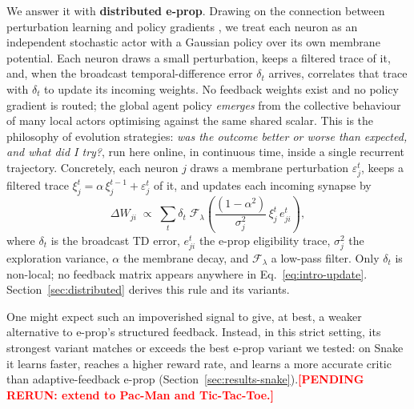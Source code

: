 \documentclass[10pt,twocolumn]{article}
\newcommand{\pending}[1]{\textcolor{red}{\bfseries[PENDING RERUN#1]}}
\begin{document}
We answer it with \textbf{distributed e-prop}. Drawing on the connection
between perturbation learning and policy gradients
\citep{fiete2006gradient,salimans2017evolutionstrategiesscalablealternative},
we treat each neuron as an independent stochastic actor with a Gaussian policy
over its own membrane potential. Each neuron draws a small perturbation, keeps
a filtered trace of it, and, when the broadcast temporal-difference error
$\delta_t$ arrives, correlates that trace with $\delta_t$ to update its
incoming weights. No feedback weights exist and no policy gradient is routed;
the global agent policy \emph{emerges} from the collective behaviour of many
local actors optimising against the same shared scalar. This is the
philosophy of evolution strategies: \emph{was the outcome better or worse
than expected, and what did I try?}, run here online, in continuous time,
inside a single recurrent trajectory. Concretely, each neuron $j$ draws a
membrane perturbation
$\varepsilon_j^t$, keeps a filtered trace
$\xi_j^t = \alpha\,\xi_j^{t-1} + \varepsilon_j^t$ of it, and updates each incoming
synapse by
\begin{equation}
\Delta W_{ji} \;\propto\; \sum_t \delta_t\;
\mathcal{F}_{\lambda}\!\left(
\frac{(1-\alpha^2)}{\sigma_j^2}\,\xi_j^t\, e_{ji}^t \right),
\label{eq:intro-update}
\end{equation}
where $\delta_t$ is the broadcast TD error, $e_{ji}^t$ the e-prop eligibility
trace, $\sigma_j^2$ the exploration variance, $\alpha$ the membrane decay, and
$\mathcal{F}_{\lambda}$ a low-pass filter. Only $\delta_t$ is non-local; no
feedback matrix appears anywhere in Eq.~\eqref{eq:intro-update}.
Section~\ref{sec:distributed} derives this rule and its variants.

One might expect such an impoverished signal to give, at best, a weaker
alternative to e-prop's structured feedback. Instead, in this strict setting,
its strongest variant matches or exceeds the best e-prop variant we tested: on
Snake it learns faster, reaches a higher reward rate, and learns a more
accurate critic than adaptive-feedback e-prop
(Section~\ref{sec:results-snake}).\pending{: extend to Pac-Man and
Tic-Tac-Toe.}
\end{document}
